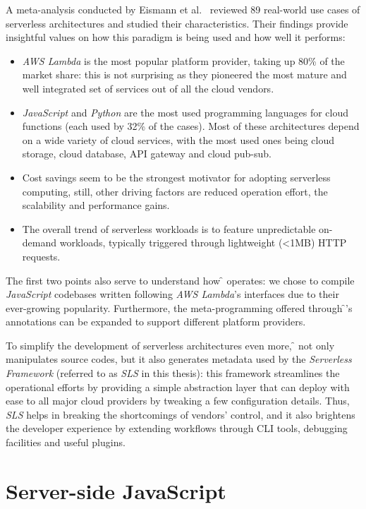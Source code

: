 A meta-analysis conducted by Eismann et al.~\cite{meta-analysis} reviewed
89 real-world use cases of serverless architectures and studied their characteristics.
Their findings provide insightful values on how this
paradigm is being used and how well it performs:
\begin{itemize}
  \item \textit{AWS Lambda} is the most popular platform provider, taking up 80\% of the market share:
    this is not surprising as they pioneered the most mature and well integrated set of services out of all
    the cloud vendors.
  \item \textit{JavaScript} and \textit{Python} are the most used
    programming languages for cloud functions (each used by 32\% of the cases).
    Most of these architectures depend on a wide variety of cloud services, with the most used
    ones being cloud storage, cloud database, API gateway and cloud pub-sub.
  \item Cost savings seem to be the strongest motivator for adopting serverless computing,
    still, other driving factors are reduced operation effort, the scalability and performance gains.
  \item The overall trend of serverless workloads is to feature unpredictable on-demand
  workloads, typically triggered through lightweight (<1MB) HTTP requests.
\end{itemize}

The first two points also serve to understand how \f{} operates:
we chose to compile \textit{JavaScript} codebases written following
\textit{AWS Lambda}'s interfaces due to their ever-growing popularity.
Furthermore, the meta-programming offered through \f{}'s annotations
can be expanded to support different platform providers.

To simplify the development of serverless architectures even more,
\f{} not only manipulates source codes, but it also generates metadata used
by the \textit{Serverless Framework} \cite{sls} (referred to as \textit{SLS} in this thesis):
this framework streamlines the operational efforts by providing a simple abstraction layer
that can deploy with ease to all major cloud providers by tweaking a few configuration details.
Thus, \textit{SLS} helps in breaking the shortcomings of vendors' control, and it also brightens
the developer experience by extending workflows through CLI tools, debugging facilities and useful plugins.

\section{Server-side JavaScript}

